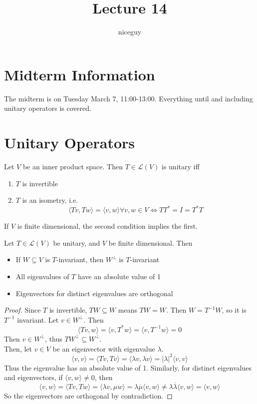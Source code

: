 \documentclass[12pt]{article}
\author{niceguy}
\title{Lecture 14}
\begin{document}
\maketitle

\section{Midterm Information}
The midterm is on Tuesday March 7, 11:00-13:00. Everything until and including unitary operators is covered.

\section{Unitary Operators}
\begin{defn}
	Let $V$ be an inner product space. Then $T \in \mathcal L(V)$ is unitary iff
	\begin{enumerate}
		\item $T$ is invertible
		\item $T$ is an isometry, i.e. 
			$$\langle Tv,Tw \rangle = \langle v,w \rangle \forall v,w \in V \Leftrightarrow TT^* = I = T^*T$$
	\end{enumerate}
\end{defn}

If $V$ is finite dimensional, the second condition implies the first.

\begin{prop}
	Let $T \in \mathcal L(V)$ be unitary, and $V$ be finite dimensional. Then
	\begin{itemize}
		\item If $W \subseteq V$ is $T$-invariant, then $W^\perp$ is $T$-invariant
		\item All eigenvalues of $T$ have an absolute value of 1
		\item Eigenvectors for distinct eigenvalues are orthogonal
	\end{itemize}
\end{prop}

\begin{proof}
	Since $T$ is invertible, $TW \subseteq W$ means $TW = W$. Then $W = T^{-1}W$, so it is $T^{-1}$ invariant. Let $v \in W^\perp$. Then
	$$\langle Tv,w \rangle = \langle v,T^*w \rangle = \langle v,T^{-1}w \rangle = 0$$
	Then $v \in W^\perp$, thus $TW^\perp \subseteq W^\perp$. \\
	Then, let $v \in V$ be an eigenvector with eigenvalue $\lambda$.
	$$\langle v,v \rangle = \langle Tv,Tv \rangle = \langle \lambda v,\lambda v \rangle = |\lambda|^2\langle v,v \rangle$$
	Thus the eigenvalue has an absolute value of 1. Similarly, for distinct eigenvalues and eigenvectors, if $\langle v,w \rangle \neq 0$, then
	$$\langle v,w \rangle = \langle Tv,Tw \rangle = \langle \lambda v,\mu w \rangle = \lambda\overline{\mu} \langle v,w \rangle \neq \lambda\overline{\lambda} \langle v,w \rangle = \langle v,w \rangle$$
	So the eigenvectors are orthogonal by contradiction.
\end{proof}
\end{document}

